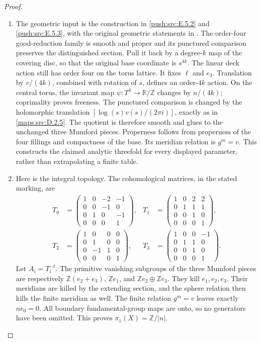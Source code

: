 \begin{proof}
\begin{enumerate}[label=\arabic*.,leftmargin=*]
\item The geometric input is the construction in \cref{push:src:E.5.2} and \cref{push:src:E.5.3}, with the original geometric statements in
\cite[Proposition 3.1, Lemma 3.2, Proposition 4.2]{manViaclovskyTwo26}.
The order-four good-reduction family is smooth and proper and its
punctured comparison preserves the distinguished section.
Pull it back by a degree-$k$ map of the covering disc, so that the
original base coordinate is $s^{4k}$. The linear deck action still
has order four on the torus lattice. It fixes $\ell$ and $e_3$.
Translation by $v/(4k)$, combined with rotation of $s$, defines
an order-$4k$ action. On the central torus, the invariant map
$\psi:T^4\to\mathbb R/\mathbb Z$ changes by $n/(4k)$;
coprimality proves freeness. The punctured comparison is changed
by the holomorphic translation
$[\log(s)v(s)/(2\pi i)]$, exactly as in \ref{maps:src:D.2.5}.
The quotient is therefore smooth and glues to the unchanged
three Mumford pieces. Properness follows from properness of the
four fillings and compactness of the base. Its meridian relation
is $g^m=v$. This constructs the claimed analytic threefold for
every displayed parameter, rather than extrapolating a finite table.

\item Here is the integral topology. The cohomological matrices, in the
stated marking, are
\[
 \begin{aligned}
 T_0&=\begin{pmatrix}1&0&-2&-1\\0&0&-1&0\\0&1&0&-1\\0&0&0&1\end{pmatrix},
 &T_1&=\begin{pmatrix}1&0&2&2\\0&1&1&1\\0&0&1&0\\0&0&0&1\end{pmatrix},\\
 T_2&=\begin{pmatrix}1&0&0&0\\0&1&0&0\\0&-1&1&0\\0&0&0&1\end{pmatrix},
 &T_3&=\begin{pmatrix}1&0&0&-1\\0&1&1&0\\0&0&1&0\\0&0&0&1\end{pmatrix}.
 \end{aligned}
\]
Let $A_i=T_i^{-t}$. The primitive vanishing subgroups of the
three Mumford pieces are respectively
$\mathbb Z(e_2+e_3)$, $\mathbb Ze_1$, and
$\mathbb Ze_2\oplus\mathbb Ze_3$.
They kill $e_1,e_2,e_3$. Their meridians are killed by the
extending section, and the sphere relation then kills the finite
meridian as well. The finite relation $g^m=v$ leaves exactly
$ne_0=0$. All boundary fundamental-group maps are onto, so
no generators have been omitted. This proves $\pi_1(X)=\mathbb Z/|n|$.


\end{enumerate}
\end{proof}
